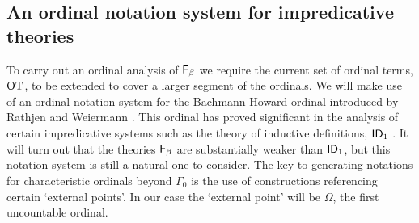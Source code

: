 \documentclass[UKenglish,cleveref,DIV=12]{scrartcl}
\theoremstyle{definition}
\theoremstyle{definition}
\begin{document}
\subsection{An ordinal notation system for impredicative theories} \label{extsec:moreordinals}
To carry out an ordinal analysis of $\mathsf{F}_\beta$ we require the current
set of ordinal terms, $\mathrm{OT}$, to be extended to cover a larger segment of the
ordinals. We will make use of an ordinal notation system for the Bachmann-Howard
ordinal introduced by Rathjen and Weiermann \cite{RW93}. This
ordinal has proved significant in
the analysis of certain impredicative systems such as the theory of inductive
definitions, $\mathsf{ID}_1$ \cite{BFPS81}. It will turn out that the theories $\mathsf{F}_\beta$ are
substantially weaker than $\mathsf{ID}_1$, but this notation system is still a
natural one to consider. The key to generating notations for characteristic
ordinals beyond $\Gamma_0$ is the use of constructions referencing certain
`external points'. In our case the `external point' will be $\Omega$, the first
uncountable ordinal.
\end{document}

